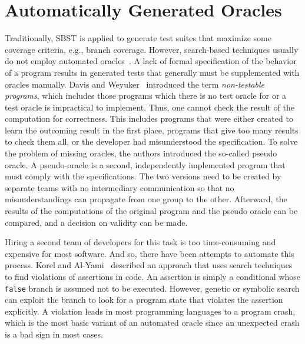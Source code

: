 \documentclass[paper=a4,%
  twoside,%
  BCOR4mm,%
  abstract=true,%
  toc=bibliography,%
  chapterprefix=true,%
  toc=bibliographynumbered,%
  open=right,%
  english,%
  pagesize=pdftex]{scrreprt}
\begin{document}
\section{Automatically Generated Oracles}
\label{sec:generated-oracles}
Traditionally, \ac{SBST} is applied to generate test suites that maximize some coverage criteria, e.g., branch coverage. However, search-based techniques usually do not employ automated oracles~\cite{Fraser2013}. A lack of formal specification of the behavior of a program results in generated tests that generally must be supplemented with oracles manually. Davis and Weyuker~\cite{10.1145/800175.809889} introduced the term \emph{non-testable programs}, which includes those programs which there is no test oracle for or a test oracle is impractical to implement. Thus, one cannot check the result of the computation for correctness. This includes programs that were either created to learn the outcoming result in the first place, programs that give too many results to check them all, or the developer had misunderstood the specification. To solve the problem of missing oracles, the authors introduced the so-called pseudo oracle. A pseudo-oracle is a second, independently implemented program that must comply with the specifications. The two versions need to be created by separate teams with no intermediary communication so that no misunderstandings can propagate from one group to the other. Afterward, the results of the computations of the original program and the pseudo oracle can be compared, and a decision on validity can be made.

Hiring a second team of developers for this task is too time-consuming and expensive for most software. And so, there have been attempts to automate this process. Korel and Al-Yami~\cite{Korel1996} described an approach that uses search techniques to find violations of assertions in code. An assertion is simply a conditional whose \texttt{false} branch is assumed not to be executed. However, genetic or symbolic search can exploit the branch to look for a program state that violates the assertion explicitly. A violation leads in most programming languages to a program crash, which is the most basic variant of an automated oracle since an unexpected crash is a bad sign in most cases.
\end{document}

